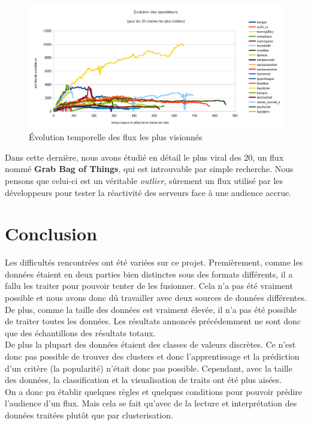 \documentclass[11pt, a4paper, titlepage]{scrartcl}
\begin{document}
\begin{figure}[h]
    \centering
    \includegraphics[width=\textwidth]{images/top_20_view_evolutions}
    \caption{\label{fig:top_20_view_evolutions} Évolution temporelle des flux
        les plus visionnés}
\end{figure}

Dans cette dernière, nous avons étudié en détail le plus viral des 20, un flux
nommé \textbf{Grab Bag of Things}, qui est introuvable par simple recherche.
Nous pensons que celui-ci est un véritable \textit{outlier}, sûrement un flux
utilisé par les développeurs pour tester la réactivité des serveurs face à une
audience accrue.

\section{Conclusion}

Les difficultés rencontrées ont été variées sur ce projet. Premièrement, comme
les données étaient en deux parties bien distinctes sous des formats différents,
il a fallu les traiter pour pouvoir tenter de les fusionner. Cela n'a pas été
vraiment possible et nous avons donc dû travailler avec deux sources de données
différentes. De plus, comme la taille des données est vraiment élevée, il n'a
pas été possible de traiter toutes les données. Les résultats annoncés
précédemment ne sont donc que des échantillons des résultats totaux. \\

De plus la plupart des données étaient des classes de valeurs discrètes. Ce
n'est donc pas possible de trouver des clusters et donc l'apprentissage et la
prédiction d'un critère (la popularité) n'était donc pas possible. Cependant,
avec la taille des données, la classification et la visualisation de traits ont
été plus aisées. \\

On a donc pu établir quelques règles et quelques conditions pour pouvoir
prédire l'audience d'un flux. Mais cela se fait qu'avec de la lecture et
interprétation des données traitées plutôt que par clusterisation.
\end{document}
